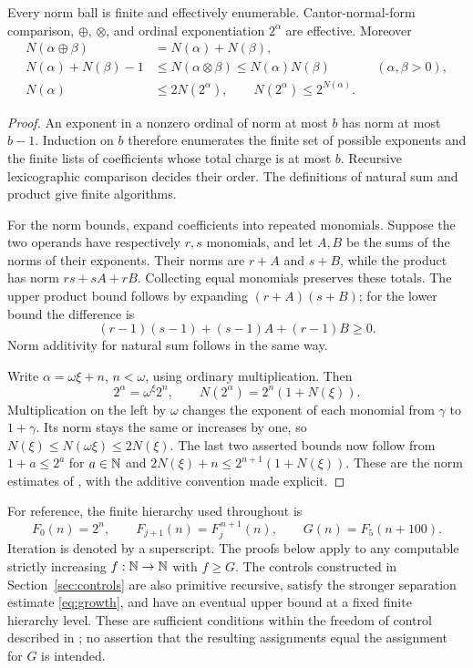 \begin{lemma}
\label{lem:norm-arithmetic}
Every norm ball is finite and effectively enumerable.  Cantor-normal-form
comparison, $\oplus$, $\otimes$, and ordinal exponentiation $2^\alpha$
are effective.  Moreover
\begin{align*}
 N(\alpha\oplus\beta)&=N(\alpha)+N(\beta),\\
 N(\alpha)+N(\beta)-1
 &\le N(\alpha\otimes\beta)\le N(\alpha)N(\beta)
       &&(\alpha,\beta>0),\\
 N(\alpha)&\le2N(2^\alpha),\qquad
 N(2^\alpha)\le2^{N(\alpha)}.
\end{align*}
\end{lemma}
\begin{proof}
An exponent in a nonzero ordinal of norm at most $b$ has norm at most
$b-1$.  Induction on $b$ therefore enumerates the finite set of possible
exponents and the finite lists of coefficients whose total charge is at
most $b$.  Recursive lexicographic comparison decides their order.
The definitions of natural sum and product give finite algorithms.

For the norm bounds, expand coefficients into repeated monomials.
Suppose the two operands have respectively $r,s$ monomials, and let
$A,B$ be the sums of the norms of their exponents.  Their norms are
$r+A$ and $s+B$, while the product has norm $rs+sA+rB$.
Collecting equal monomials preserves these totals.  The upper product
bound follows by expanding $(r+A)(s+B)$; for the lower bound the
difference is
\[
 (r-1)(s-1)+(s-1)A+(r-1)B\ge0.
\]
Norm additivity for natural sum follows in the same way.

Write $\alpha=\omega\xi+n$, $n<\omega$, using ordinary
multiplication.  Then
\[
 2^\alpha=\omega^\xi 2^n,\qquad
 N(2^\alpha)=2^n(1+N(\xi)).
\]
Multiplication on the left by $\omega$ changes the exponent of each
monomial from $\gamma$ to $1+\gamma$.  Its norm stays the same or
increases by one, so
$N(\xi)\le N(\omega\xi)\le2N(\xi)$.
The last two asserted bounds now follow from
$1+a\le2^a$ for $a\in\mathbb N$ and
$2N(\xi)+n\le2^{n+1}(1+N(\xi))$.
These are the norm estimates of \cite[Proposition~2.2]{ww}, with the
additive convention made explicit.
\end{proof}

For reference, the finite hierarchy used throughout is
\[
 F_0(n)=2^n,\qquad F_{j+1}(n)=F_j^{\,n+1}(n),\qquad
 G(n)=F_5(n+100).
\]
Iteration is denoted by a superscript.  The proofs below apply to any
computable strictly increasing $f:\mathbb N\to\mathbb N$ with $f\ge G$.
The controls constructed in Section~\ref{sec:controls} are also primitive
recursive, satisfy the stronger separation estimate
\eqref{eq:growth}, and have an eventual upper bound at a fixed finite
hierarchy level.  These are sufficient conditions within the freedom of
control described in \cite[Section~2.1]{ww}; no assertion that the
resulting assignments equal the assignment for $G$ is intended.

